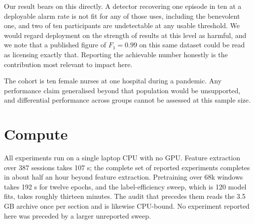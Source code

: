 Our result bears on this directly. A detector recovering one episode in ten at
a deployable alarm rate is not fit for any of those uses, including the
benevolent one, and two of ten participants are undetectable at any usable
threshold. We would regard deployment on the strength of results at this level
as harmful, and we note that a published figure of $F_1 = 0.99$ on this same
dataset could be read as licensing exactly that. Reporting the achievable
number honestly is the contribution most relevant to impact here.

The cohort is ten female nurses at one hospital during a pandemic. Any
performance claim generalised beyond that population would be unsupported, and
differential performance across groups cannot be assessed at this sample size.

\section{Compute} All experiments run on a single laptop CPU with no GPU.
Feature extraction over 387 sessions takes 107 s; the complete set
of reported experiments completes in about half an hour beyond feature
extraction. Pretraining over 68k windows takes 192 s for twelve epochs, and the
label-efficiency sweep, which is 120 model fits, takes roughly thirteen
minutes. The audit that precedes
them reads the 3.5 GB archive once per section and is likewise
CPU-bound. No experiment reported here was preceded by a larger unreported
sweep.



\newpage




